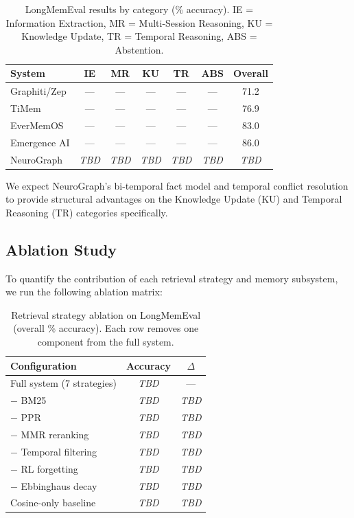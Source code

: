 \documentclass[11pt,a4paper,twocolumn]{article}
\begin{document}
\begin{table}[H]
\centering
\caption{LongMemEval results by category (\% accuracy).
IE = Information Extraction, MR = Multi-Session Reasoning,
KU = Knowledge Update, TR = Temporal Reasoning,
ABS = Abstention.}
\label{tab:longmemeval}
\footnotesize
\begin{tabular}{lccccc|c}
\toprule
\textbf{System} & \textbf{IE} & \textbf{MR} & \textbf{KU}
& \textbf{TR} & \textbf{ABS} & \textbf{Overall} \\
\midrule
Graphiti/Zep & --- & --- & --- & --- & --- & 71.2 \\
TiMem & --- & --- & --- & --- & --- & 76.9 \\
EverMemOS & --- & --- & --- & --- & --- & 83.0 \\
Emergence AI & --- & --- & --- & --- & --- & 86.0 \\
\midrule
NeuroGraph & \textit{TBD} & \textit{TBD} & \textit{TBD}
& \textit{TBD} & \textit{TBD} & \textit{TBD} \\
\bottomrule
\end{tabular}
\end{table}

We expect NeuroGraph's bi-temporal fact model and temporal
conflict resolution to provide structural advantages on the
Knowledge Update (KU) and Temporal Reasoning (TR) categories
specifically.

\subsection{Ablation Study}

To quantify the contribution of each retrieval strategy and
memory subsystem, we run the following ablation matrix:

\begin{table}[H]
\centering
\caption{Retrieval strategy ablation on LongMemEval (overall
\% accuracy). Each row removes one component from the full system.}
\label{tab:ablation}
\footnotesize
\begin{tabular}{lcc}
\toprule
\textbf{Configuration} & \textbf{Accuracy} & \textbf{$\Delta$} \\
\midrule
Full system (7 strategies) & \textit{TBD} & --- \\
\quad $-$ BM25 & \textit{TBD} & \textit{TBD} \\
\quad $-$ PPR & \textit{TBD} & \textit{TBD} \\
\quad $-$ MMR reranking & \textit{TBD} & \textit{TBD} \\
\quad $-$ Temporal filtering & \textit{TBD} & \textit{TBD} \\
\quad $-$ RL forgetting & \textit{TBD} & \textit{TBD} \\
\quad $-$ Ebbinghaus decay & \textit{TBD} & \textit{TBD} \\
Cosine-only baseline & \textit{TBD} & \textit{TBD} \\
\bottomrule
\end{tabular}
\end{table}
\end{document}
